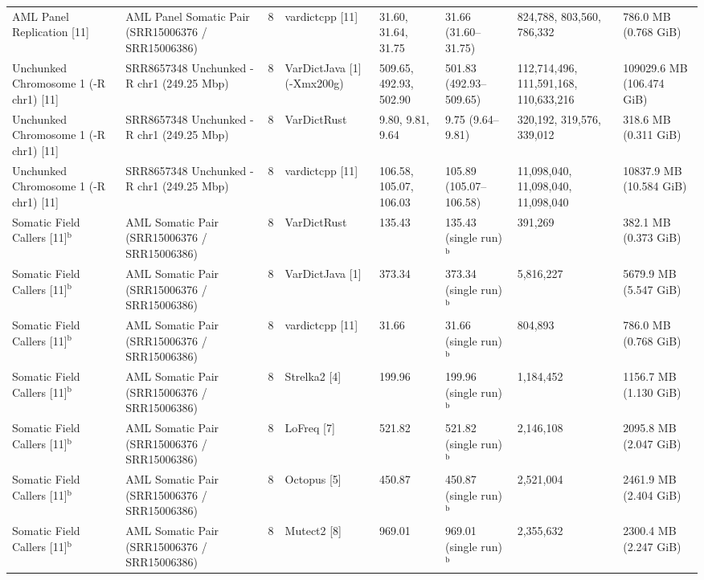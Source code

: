 \begin{table}[htbp]
{\begin{tabular}{llllllll}
AML Panel Replication [11] & AML Panel Somatic Pair (SRR15006376 / SRR15006386) & 8 & vardictcpp [11] & 31.60, 31.64, 31.75 & 31.66 (31.60--31.75) & 824,788, 803,560, 786,332 & 786.0 MB (0.768 GiB) \\
Unchunked Chromosome 1 (-R chr1) [11] & SRR8657348 Unchunked -R chr1 (249.25 Mbp) & 8 & VarDictJava [1] (-Xmx200g) & 509.65, 492.93, 502.90 & 501.83 (492.93--509.65) & 112,714,496, 111,591,168, 110,633,216 & 109029.6 MB (106.474 GiB) \\
Unchunked Chromosome 1 (-R chr1) [11] & SRR8657348 Unchunked -R chr1 (249.25 Mbp) & 8 & VarDictRust & 9.80, 9.81, 9.64 & 9.75 (9.64--9.81) & 320,192, 319,576, 339,012 & 318.6 MB (0.311 GiB) \\
Unchunked Chromosome 1 (-R chr1) [11] & SRR8657348 Unchunked -R chr1 (249.25 Mbp) & 8 & vardictcpp [11] & 106.58, 105.07, 106.03 & 105.89 (105.07--106.58) & 11,098,040, 11,098,040, 11,098,040 & 10837.9 MB (10.584 GiB) \\
Somatic Field Callers [11]$^{\text{b}}$ & AML Somatic Pair (SRR15006376 / SRR15006386) & 8 & VarDictRust & 135.43 & 135.43 (single run)$^{\text{b}}$ & 391,269 & 382.1 MB (0.373 GiB) \\
Somatic Field Callers [11]$^{\text{b}}$ & AML Somatic Pair (SRR15006376 / SRR15006386) & 8 & VarDictJava [1] & 373.34 & 373.34 (single run)$^{\text{b}}$ & 5,816,227 & 5679.9 MB (5.547 GiB) \\
Somatic Field Callers [11]$^{\text{b}}$ & AML Somatic Pair (SRR15006376 / SRR15006386) & 8 & vardictcpp [11] & 31.66 & 31.66 (single run)$^{\text{b}}$ & 804,893 & 786.0 MB (0.768 GiB) \\
Somatic Field Callers [11]$^{\text{b}}$ & AML Somatic Pair (SRR15006376 / SRR15006386) & 8 & Strelka2 [4] & 199.96 & 199.96 (single run)$^{\text{b}}$ & 1,184,452 & 1156.7 MB (1.130 GiB) \\
Somatic Field Callers [11]$^{\text{b}}$ & AML Somatic Pair (SRR15006376 / SRR15006386) & 8 & LoFreq [7] & 521.82 & 521.82 (single run)$^{\text{b}}$ & 2,146,108 & 2095.8 MB (2.047 GiB) \\
Somatic Field Callers [11]$^{\text{b}}$ & AML Somatic Pair (SRR15006376 / SRR15006386) & 8 & Octopus [5] & 450.87 & 450.87 (single run)$^{\text{b}}$ & 2,521,004 & 2461.9 MB (2.404 GiB) \\
Somatic Field Callers [11]$^{\text{b}}$ & AML Somatic Pair (SRR15006376 / SRR15006386) & 8 & Mutect2 [8] & 969.01 & 969.01 (single run)$^{\text{b}}$ & 2,355,632 & 2300.4 MB (2.247 GiB) \\

\end{tabular}}
\end{table}
